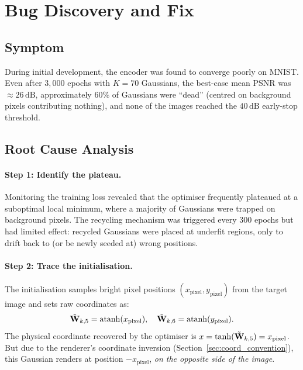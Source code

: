 \section{Bug Discovery and Fix}
\label{sec:bug}

\subsection{Symptom}

During initial development, the encoder was found to converge poorly on MNIST.
Even after $3{,}000$ epochs with $K = 70$ Gaussians, the best-case mean PSNR was
${\approx}26\,\text{dB}$, approximately $60\%$ of Gaussians were ``dead''
(centred on background pixels contributing nothing), and none of the images
reached the $40\,\text{dB}$ early-stop threshold.

\subsection{Root Cause Analysis}

\paragraph{Step 1: Identify the plateau.}
Monitoring the training loss revealed that the optimiser frequently
plateaued at a suboptimal local minimum, where a majority of Gaussians were
trapped on background pixels.  The recycling mechanism was triggered every
$300$ epochs but had limited effect: recycled Gaussians were placed at
underfit regions, only to drift back to (or be newly seeded at) wrong positions.

\paragraph{Step 2: Trace the initialisation.}
The initialisation samples bright pixel positions $(x_\text{pixel}, y_\text{pixel})$
from the target image and sets raw coordinates as:
\begin{equation}
  \tilde{\mathbf{W}}_{k,5} = \operatorname{atanh}(x_\text{pixel}), \quad
  \tilde{\mathbf{W}}_{k,6} = \operatorname{atanh}(y_\text{pixel}).
  \label{eq:buggy_init}
\end{equation}
The physical coordinate recovered by the optimiser is
$x = \tanh(\tilde{\mathbf{W}}_{k,5}) = x_\text{pixel}$.
But due to the renderer's coordinate inversion (Section~\ref{sec:coord_convention}),
this Gaussian renders at position $-x_\text{pixel}$, \emph{on the opposite side of
the image}.

